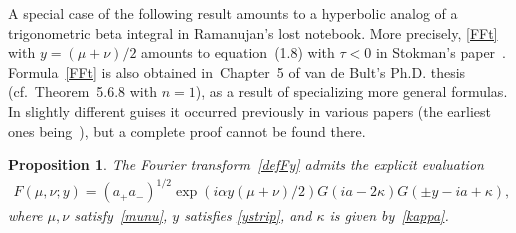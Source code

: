 \documentclass[11pt]{article}
\numberwithin{equation}{section}
\newtheorem{prop}[lem]{Proposition}
\begin{document}
A special case of the following result amounts to a hyperbolic analog of a trigonometric beta integral in Ramanujan's lost notebook. More precisely, \eqref{FFt} with $y=(\mu+\nu)/2$ amounts to equation~(1.8) with $\tau<0$ in Stokman's paper~\cite{stok}. Formula~\eqref{FFt} is also obtained in~Chapter~5 of van de Bult's Ph.D. thesis~\cite{bult2} (cf.~Theorem~5.6.8 with $n=1$), as a result of specializing more general formulas. In slightly dif\/ferent guises it occurred previously in various papers (the earliest ones being~\cite{faka,kash,pote}), but a complete proof cannot be found there.

\begin{prop}\label{propositionC.1}
The Fourier transform~\eqref{defFy} admits the explicit evaluation
\begin{gather}\label{FFt}
F(\mu,\nu;y)=(a_{+}a_{-})^{1/2}\exp(i\alpha y(\mu+\nu)/2)G(ia-2\kappa)G(\pm y-ia+\kappa),
\end{gather}
where $\mu,\nu$ satisfy~\eqref{munu}, $y$ satisfies \eqref{ystrip}, and $\kappa$ is given by~\eqref{kappa}.
\end{prop}
\end{document}
